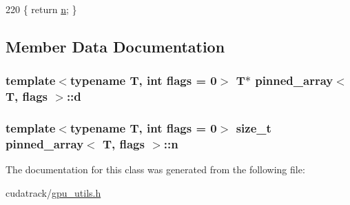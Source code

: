 \begin{DoxyCode}
220 \{ \textcolor{keywordflow}{return} \hyperlink{classpinned__array_a8038d2f3dbfca5173ef9e4727cbac721}{n}; \}
\end{DoxyCode}


\subsection{Member Data Documentation}
\subsubsection[{\texorpdfstring{d}{d}}]{\setlength{\rightskip}{0pt plus 5cm}template$<$typename T, int flags = 0$>$ T$\ast$ {\bf pinned\+\_\+array}$<$ T, flags $>$\+::d\hspace{0.3cm}{\ttfamily [protected]}}\hypertarget{classpinned__array_a5ffd81435f51946d3f9365fd49ab0274}{}\label{classpinned__array_a5ffd81435f51946d3f9365fd49ab0274}
\subsubsection[{\texorpdfstring{n}{n}}]{\setlength{\rightskip}{0pt plus 5cm}template$<$typename T, int flags = 0$>$ size\+\_\+t {\bf pinned\+\_\+array}$<$ T, flags $>$\+::n\hspace{0.3cm}{\ttfamily [protected]}}\hypertarget{classpinned__array_a8038d2f3dbfca5173ef9e4727cbac721}{}\label{classpinned__array_a8038d2f3dbfca5173ef9e4727cbac721}


The documentation for this class was generated from the following file\+:\begin{DoxyCompactItemize}
\item 
cudatrack/\hyperlink{gpu__utils_8h}{gpu\+\_\+utils.\+h}\end{DoxyCompactItemize}
